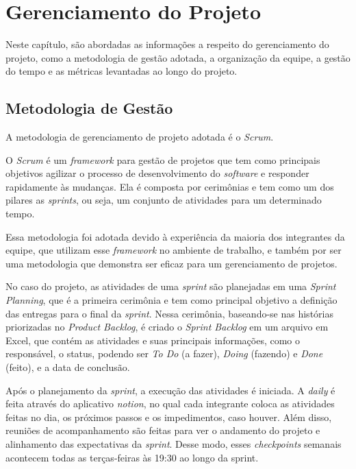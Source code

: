 \documentclass[
    12pt,               %
    openright,          %
    oneside,
    a4paper,            %
    english,            %
    brazil              %
    ]{ifsp-spo-inf-ctds} %
\begin{document}
\chapter{Gerenciamento do Projeto}
Neste capítulo, são abordadas as informações a respeito do gerenciamento do projeto, como a metodologia de gestão adotada, a organização da equipe, a gestão do tempo e as métricas levantadas ao longo do projeto.

\section{Metodologia de Gestão}
A metodologia de gerenciamento de projeto adotada é o \textit{Scrum}.

O \textit{Scrum} é um \textit{\gls{framework}} para gestão de projetos que tem como principais objetivos agilizar o processo de desenvolvimento do \textit{\gls{software}} e responder rapidamente às mudanças. Ela é composta por cerimônias e tem como um dos pilares as \textit{\glspl{sprint}}, ou seja, um conjunto de atividades para um determinado tempo. 

Essa metodologia foi adotada devido à experiência da maioria dos integrantes da equipe, que utilizam esse \textit{\gls{framework}} no ambiente de trabalho, e também por ser uma metodologia que demonstra ser eficaz para um gerenciamento de projetos.


No caso do projeto, as atividades de uma \textit{\gls{sprint}} são planejadas em uma \textit{Sprint Planning}, que é a primeira cerimônia e tem como principal objetivo a definição das entregas para o final da \textit{\gls{sprint}}. Nessa cerimônia, baseando-se nas histórias priorizadas no \textit{Product Backlog}, é criado o \textit{Sprint Backlog} em um arquivo em Excel, que contém as atividades e suas principais informações, como o responsável, o status, podendo ser \textit{To Do} (a fazer), \textit{Doing} (fazendo) e \textit{Done} (feito), e a data de conclusão. 


Após o planejamento da \textit{\gls{sprint}}, a execução das atividades é iniciada. A \textit{\gls{daily}} é feita através do aplicativo \textit{\gls{notion}}, no qual cada integrante coloca as atividades feitas no dia, os próximos passos e os impedimentos, caso houver. Além disso, reuniões de acompanhamento são feitas para ver o andamento do projeto e alinhamento das expectativas da \textit{\gls{sprint}}. Desse modo, esses \textit{\glspl{checkpoint}} semanais acontecem todas as terças-feiras às 19:30 ao longo da sprint. 
\end{document}
